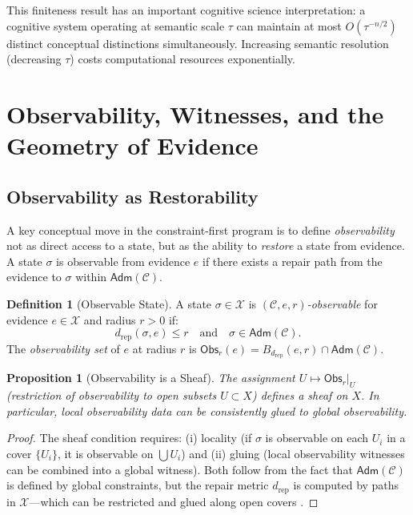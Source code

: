 \documentclass[a4paper,12pt]{article}
\newtheorem{proposition}[theorem]{Proposition}
\theoremstyle{definition}
\newtheorem{definition}{Definition}[section]
\newcommand{\X}{\mathcal{X}}
\newcommand{\Adm}{\mathsf{Adm}}
\newcommand{\dRP}{d_{\mathrm{rep}}}
\newcommand{\Obs}{\mathsf{Obs}}
\begin{document}
This finiteness result has an important cognitive science interpretation: a cognitive system operating at semantic scale $\tau$ can maintain at most $O(\tau^{-n/2})$ distinct conceptual distinctions simultaneously. Increasing semantic resolution (decreasing $\tau$) costs computational resources exponentially.

\section{Observability, Witnesses, and the Geometry of Evidence}
\label{sec:witnesses}

\subsection{Observability as Restorability}

A key conceptual move in the constraint-first program is to define \emph{observability} not as direct access to a state, but as the ability to \emph{restore} a state from evidence. A state $\sigma$ is observable from evidence $e$ if there exists a repair path from the evidence to $\sigma$ within $\Adm(\mathcal{C})$.

\begin{definition}[Observable State]
\label{def:observable}
A state $\sigma \in \X$ is \emph{$(\mathcal{C}, e, r)$-observable} for evidence $e \in \X$ and radius $r > 0$ if:
\[
\dRP(\sigma, e) \leq r \quad \text{and} \quad \sigma \in \Adm(\mathcal{C}).
\]
The \emph{observability set} of $e$ at radius $r$ is $\Obs_r(e) = B_{\dRP}(e, r) \cap \Adm(\mathcal{C})$.
\end{definition}

\begin{proposition}[Observability is a Sheaf]
\label{prop:obs_sheaf}
The assignment $U \mapsto \Obs_r|_U$ (restriction of observability to open subsets $U \subset X$) defines a sheaf on $X$. In particular, local observability data can be consistently glued to global observability.
\end{proposition}

\begin{proof}
The sheaf condition requires: (i) locality (if $\sigma$ is observable on each $U_i$ in a cover $\{U_i\}$, it is observable on $\bigcup U_i$) and (ii) gluing (local observability witnesses can be combined into a global witness). Both follow from the fact that $\Adm(\mathcal{C})$ is defined by global constraints, but the repair metric $\dRP$ is computed by paths in $\X$—which can be restricted and glued along open covers \cite{MacLane1998}.
\end{proof}
\end{document}
